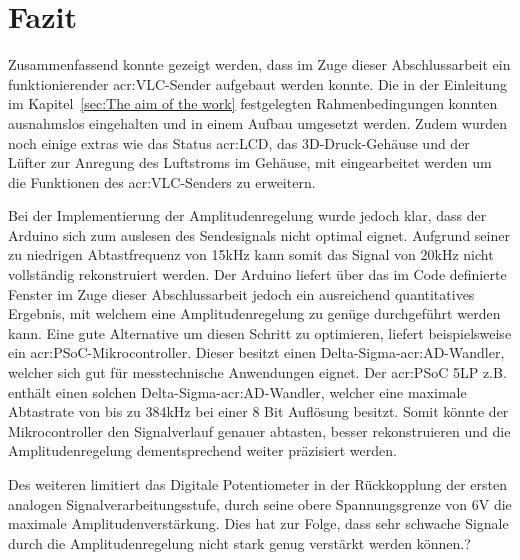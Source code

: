 
\chapter{Fazit}
\label{sec:conclusion_future-work}

Zusammenfassend konnte gezeigt werden, dass im Zuge dieser Abschlussarbeit ein funktionierender \gls{acr:VLC}-Sender aufgebaut werden konnte. Die in der Einleitung im Kapitel~\ref{sec:The aim of the work} festgelegten Rahmenbedingungen konnten ausnahmslos eingehalten und in einem Aufbau umgesetzt werden. Zudem wurden noch einige extras wie das Status \gls{acr:LCD}, das 3D-Druck-Gehäuse und der Lüfter zur Anregung des Luftstroms im Gehäuse, mit eingearbeitet werden um die Funktionen des \gls{acr:VLC}-Senders zu erweitern. 

Bei der Implementierung der Amplitudenregelung wurde jedoch klar, dass der Arduino sich zum auslesen des Sendesignals nicht optimal eignet. Aufgrund seiner zu niedrigen Abtastfrequenz von 15kHz kann somit das Signal von 20kHz nicht vollständig rekonstruiert werden. Der Arduino liefert über das im Code definierte Fenster im Zuge dieser Abschlussarbeit jedoch ein ausreichend quantitatives Ergebnis, mit welchem eine Amplitudenregelung zu genüge durchgeführt werden kann. Eine gute Alternative um diesen Schritt zu optimieren, liefert beispielsweise ein \gls{acr:PSoC}-Mikrocontroller. Dieser besitzt einen Delta-Sigma-\gls{acr:AD}-Wandler, welcher sich gut für messtechnische Anwendungen eignet. Der \gls{acr:PSoC} 5LP z.B. enthält einen solchen Delta-Sigma-\gls{acr:AD}-Wandler, welcher eine maximale Abtastrate von bis zu 384kHz bei einer 8 Bit Auflösung besitzt. Somit könnte der Mikrocontroller den Signalverlauf genauer abtasten, besser rekonstruieren und die Amplitudenregelung dementsprechend weiter präzisiert werden. 

Des weiteren limitiert das Digitale Potentiometer in der Rückkopplung der ersten analogen Signalverarbeitungsstufe, durch seine obere Spannungsgrenze von 6V die maximale Amplitudenverstärkung. Dies hat zur Folge, dass sehr schwache Signale durch die Amplitudenregelung nicht stark genug verstärkt werden können.?